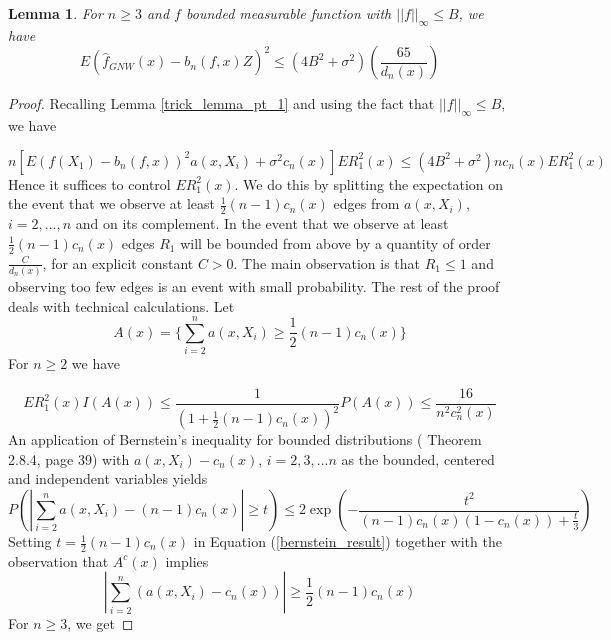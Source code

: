 \documentclass{article}
\newtheorem{lemma}[theorem]{Lemma}
\begin{document}
\begin{lemma} 
\label{trick_lemma_pt2}
For $n\geq 3$ and $f$ bounded measurable function with $||f||_{\infty}\leq B$, we have
\begin{equation*}
    E(\hat{f}_{GNW}(x)-b_n(f,x)Z)^2\leq (4B^2+\sigma^2)(\frac{65}{d_n(x)})
\end{equation*}
\end{lemma}
\begin{proof}
Recalling Lemma \ref{trick_lemma_pt_1} and using the fact that $||f||_{\infty}\leq B$, we have 


\begin{equation}
\label{ubv_1}
     n[E(f(X_1)-b_n(f,x))^2a(x,X_i)+\sigma^2c_n(x)]ER_1^2(x)
     \leq (4B^2+\sigma^2)nc_n(x)ER^2_1(x)
\end{equation}
Hence it suffices to control $ER_1^2(x)$. We do this by splitting the expectation on the event that we observe at least $\frac{1}{2}(n-1)c_n(x)$ edges from $a(x,X_i)$, $i=2,...,n$ and on its complement. In the event that we observe at least $\frac{1}{2}(n-1)c_n(x)$ edges $R_1$ will be bounded from above by a quantity of order $\frac{C}{d_n(x)}$, for an explicit constant $C>0$. The main observation is that $R_1\leq 1$ and observing too few edges is an event with small probability. The rest of the proof deals with technical calculations. Let 
\begin{equation}
    A(x)=\{\sum_{i=2}^na(x,X_i)\geq \frac{1}{2}(n-1)c_n(x)\}
\end{equation}
For $n\geq 2$ we have

\begin{equation}
\label{meat_good_part}
ER_1^2(x)I(A(x))\leq \frac{1}{(1+\frac{1}{2}(n-1)c_n(x))^2}P(A(x))\leq \frac{16}{n^2c_n^2(x)}
\end{equation}
An application of Bernstein's inequality for bounded distributions (\cite{vershynin} Theorem 2.8.4, page 39) with $a(x,X_i)-c_n(x)$, $i=2,3,...n$ as the bounded, centered and independent variables yields
\begin{equation}
\label{bernstein_result}
P(|\sum_{i=2}^{n}a(x,X_i)-(n-1)c_n(x)|\geq t)\leq 2\exp{(-\frac{t^2}{(n-1)c_n(x)(1-c_n(x))+\frac{t}{3}})}
\end{equation}
Setting $t=\frac{1}{2}(n-1)c_n(x)$ in Equation (\ref{bernstein_result}) together with the observation that $A^c(x)$ implies 
\begin{equation*}
    |\sum_{i=2}^{n}(a(x,X_i)-c_n(x))|\geq \frac{1}{2}(n-1)c_n(x)
\end{equation*}
For $n\geq 3$, we get


\end{proof}
\end{document}

